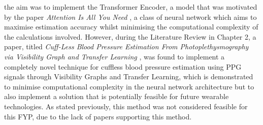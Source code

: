 the aim was to implement the Transformer Encoder, a model that was motivated by the paper \emph{Attention Is All You Need} \cite{transformers}, a class of 
neural network which aims to maximise estimation accuracy whilst minimising the computational complexity of the calculations involved. However, during the Literature Review in Chapter 2, a paper, titled \emph{Cuff-Less Blood Pressure Estimation From Photoplethysmography via Visibility Graph and Transfer Learning} \cite{Wang2022}, was found to implement a completely novel 
technique for cuffless blood pressure estimation using PPG signals through Visibility Graphs and Transfer Learning, which is demonstrated to minimise computational complexity in the neural network architecture but to also implement a solution that is potentially feasible for 
future wearable technologies. As stated previously, this method was not considered feasible for this FYP, due to the lack 
of papers supporting this method.